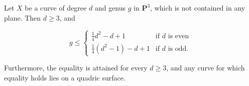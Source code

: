 Let $X$ be a curve of degree $d$ and genus $g$ in $\mathbf{P}^3$, which is not contained in any plane. Then $d \geqslant 3$, and

$$g \leqslant \begin{cases} \frac{1}{4} d^2 - d + 1 & \text{if } d \text{ is even} \\ \frac{1}{4} (d^2 - 1) - d + 1 & \text{if } d \text{ is odd.} \end{cases}$$

Furthermore, the equality is attained for every $d \geqslant 3$, and any curve for which equality holds lies on a quadric surface.
